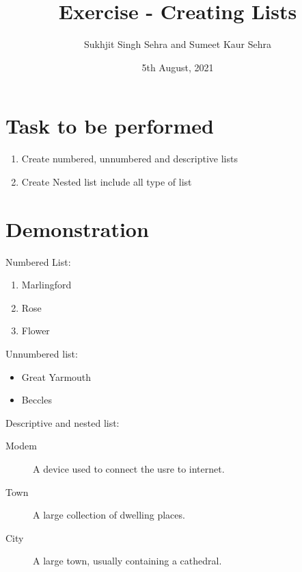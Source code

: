 \documentclass[12pt]{article}
\title{Exercise  - Creating Lists }
\author{Sukhjit Singh Sehra and Sumeet Kaur Sehra}
\date{5th August, 2021}
\begin{document}
	\maketitle
	\section*{Task to be performed}
	\begin{enumerate}
		\item Create numbered, unnumbered and descriptive lists
		\item Create Nested list include all type of list
	\end{enumerate}
\section*{Demonstration}	
Numbered List:
	
\begin{enumerate}

	   	
\item Marlingford
   	
\item Rose
\item Flower
	   	
\end{enumerate}

Unnumbered list:
\begin{itemize}
\item Great Yarmouth
\item Beccles
\end{itemize}

Descriptive and nested list:
\begin{description}

  \item[Modem] A device used to connect the usre to internet.
   \item[Town] A large collection of dwelling places.    
  \item[City] A large town, usually containing a cathedral.  
\end{description}
\end{document}
